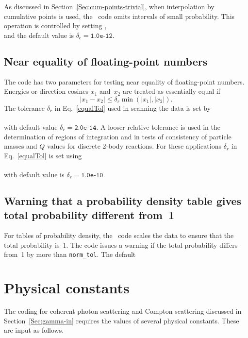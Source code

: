  \label{Sec:cum-prob-skip}
As discussed
in Section~\ref{Sec:cum-points-trivial}, when interpolation
by cumulative points is used,
the \gettransfer\ code omits intervals of small probability.
This operation is controlled by setting
  ,\\
and the default value is $\delta_c = \texttt{1.0e-12}$.



\subsection{Near equality of floating-point numbers}
\label{Sec:floatingPoint}
The code has two parameters for testing near equality of floating-point numbers.
Energies or direction cosines $x_1$ and~$x_2$ are treated
as essentially equal if
\begin{equation}
  | x_1 - x_2 | \le \delta_r \min( | x_1 |, | x_2 | ).
 \label{equalTol}
\end{equation}
The tolerance $\delta_r$ in Eq.~\eqref{equalTol}  used in scanning the
data is set by\\
  \\
with default value $\delta_r = \texttt{2.0e-14}$.
A looser relative tolerance is used in the determination of regions
of integration and in tests of consistency of particle masses and $Q$
values for discrete 2-body reactions.  For these applications
$\delta_r$ in Eq.~\eqref{equalTol} is set using\\
  \\
with default value is $\delta_r = \texttt{1.0e-10}$.

\subsection{Warning that a probability density table
gives total probability different from~1}
For tables of probability density, the \gettransfer\ code scales the
data to ensure that the total probability is~1.  The code issues a
warning if the total probability differs from~1 by more than
\texttt{norm\_tol}.  The default\\


\section{Physical constants}
The coding for coherent photon scattering and Compton scattering
discussed in Section~\ref{Sec:gamma-in} requires the values of several physical
constants.  These are input as follows.

